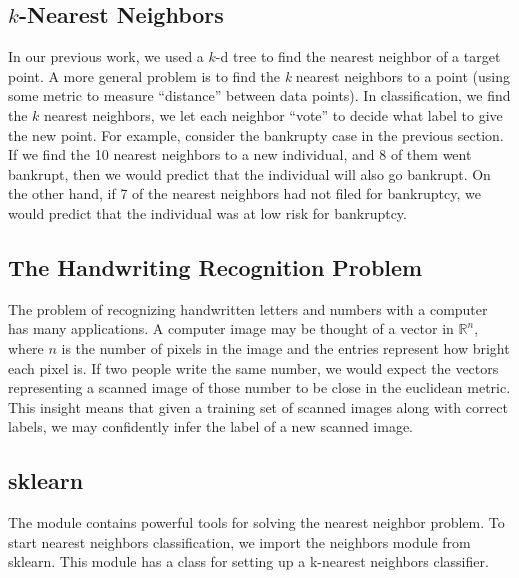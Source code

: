 \subsection*{$k$-Nearest Neighbors} %

In our previous work, we used a $k$-d tree to find the nearest neighbor of a target point.
A more general problem is to find the \emph{k} nearest neighbors to a point (using some metric to measure ``distance'' between data points).
In classification, we find the $k$ nearest neighbors, we let each neighbor ``vote'' to decide what label to give the new point.
For example, consider the bankrupty case in the previous section.
If we find the 10 nearest neighbors to a new individual, and 8 of them went bankrupt, then we would predict that the individual will also go bankrupt.
On the other hand, if 7 of the nearest neighbors had not filed for bankruptcy, we would predict that the individual was at low risk for bankruptcy.

\subsection*{The Handwriting Recognition Problem} %

The problem of recognizing handwritten letters and numbers with a computer has many applications.
A computer image may be thought of a vector in $\mathbb{R}^n$, where $n$ is the number of pixels in the image and the entries represent how bright each pixel is.
If two people write the same number, we would expect the vectors representing a scanned image of those number to be close in the euclidean metric.
This insight means that given a training set of scanned images along with correct labels, we may confidently infer the label of a new scanned image.

\subsection*{sklearn} %

The  module contains powerful tools for solving the nearest neighbor problem.
To start nearest neighbors classification, we import the neighbors module from sklearn.
This module has a class for setting up a k-nearest neighbors classifier.

